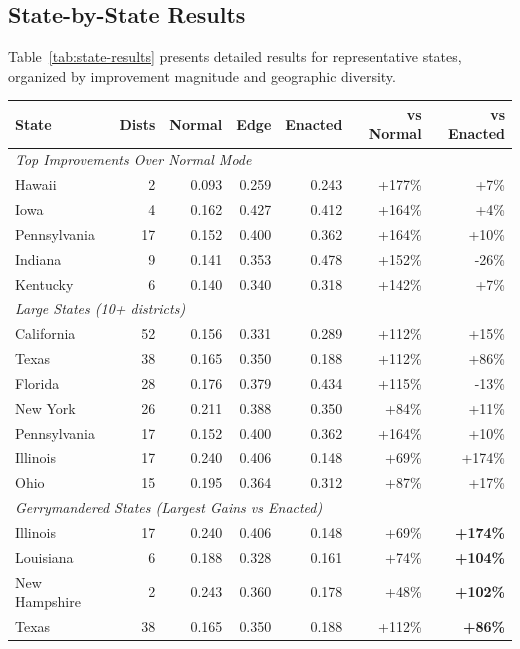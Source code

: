 \subsection{State-by-State Results}

Table~\ref{tab:state-results} presents detailed results for representative states, organized by improvement magnitude and geographic diversity.

\begin{table}[t]
\centering
\small
\begin{tabular}{lrrrrrr}
\toprule
\textbf{State} & \textbf{Dists} & \textbf{Normal} & \textbf{Edge} & \textbf{Enacted} & \textbf{vs Normal} & \textbf{vs Enacted} \\
\midrule
\multicolumn{7}{l}{\textit{Top Improvements Over Normal Mode}} \\
Hawaii & 2 & 0.093 & 0.259 & 0.243 & +177\% & +7\% \\
Iowa & 4 & 0.162 & 0.427 & 0.412 & +164\% & +4\% \\
Pennsylvania & 17 & 0.152 & 0.400 & 0.362 & +164\% & +10\% \\
Indiana & 9 & 0.141 & 0.353 & 0.478 & +152\% & -26\% \\
Kentucky & 6 & 0.140 & 0.340 & 0.318 & +142\% & +7\% \\
\midrule
\multicolumn{7}{l}{\textit{Large States (10+ districts)}} \\
California & 52 & 0.156 & 0.331 & 0.289 & +112\% & +15\% \\
Texas & 38 & 0.165 & 0.350 & 0.188 & +112\% & +86\% \\
Florida & 28 & 0.176 & 0.379 & 0.434 & +115\% & -13\% \\
New York & 26 & 0.211 & 0.388 & 0.350 & +84\% & +11\% \\
Pennsylvania & 17 & 0.152 & 0.400 & 0.362 & +164\% & +10\% \\
Illinois & 17 & 0.240 & 0.406 & 0.148 & +69\% & +174\% \\
Ohio & 15 & 0.195 & 0.364 & 0.312 & +87\% & +17\% \\
\midrule
\multicolumn{7}{l}{\textit{Gerrymandered States (Largest Gains vs Enacted)}} \\
Illinois & 17 & 0.240 & 0.406 & 0.148 & +69\% & \textbf{+174\%} \\
Louisiana & 6 & 0.188 & 0.328 & 0.161 & +74\% & \textbf{+104\%} \\
New Hampshire & 2 & 0.243 & 0.360 & 0.178 & +48\% & \textbf{+102\%} \\
Texas & 38 & 0.165 & 0.350 & 0.188 & +112\% & \textbf{+86\%} \\

\end{tabular}
\end{table}
